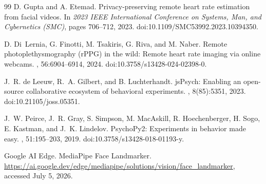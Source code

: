 \documentclass[dvipdfmx]{ehis}
\begin{document}
{\begin{thebibliography}{99}
D. Gupta and A. Etemad.
\newblock Privacy-preserving remote heart rate estimation from facial videos.
\newblock In {\em 2023 IEEE International Conference on Systems, Man, and Cybernetics (SMC)}, pages 706--712, 2023.
\newblock doi:10.1109/SMC53992.2023.10394350.

D. Di~Lernia, G. Finotti, M. Tsakiris, G. Riva, and M. Naber.
\newblock Remote photoplethysmography (rPPG) in the wild: Remote heart rate imaging via online webcams.
, 56:6904--6914, 2024.
\newblock doi:10.3758/s13428-024-02398-0.

J.~R. de Leeuw, R.~A. Gilbert, and B. Luchterhandt.
\newblock jsPsych: Enabling an open-source collaborative ecosystem of behavioral experiments.
, 8(85):5351, 2023.
\newblock doi:10.21105/joss.05351.

J.~W. Peirce, J.~R. Gray, S. Simpson, M. MacAskill, R. Hoechenberger, H. Sogo, E. Kastman, and J.~K. Lindelov.
\newblock PsychoPy2: Experiments in behavior made easy.
, 51:195--203, 2019.
\newblock doi:10.3758/s13428-018-01193-y.

Google AI Edge.
\newblock MediaPipe Face Landmarker.
\newblock \url{https://ai.google.dev/edge/mediapipe/solutions/vision/face_landmarker}, accessed July 5, 2026.

\end{thebibliography}
}
\end{document}
